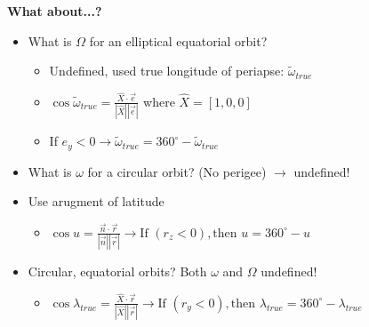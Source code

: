 \documentclass{article}
\begin{document}
\begin{multicols*}{3}
    \textbf{What about...?}
    \begin{itemize}
        \item What is $\Omega$ for an elliptical equatorial orbit?
            \begin{itemize}
                \item Undefined, used true longitude of periapse: $\tilde{\omega}_{true}$
                \item $\cos{\tilde{\omega}_{true}}=\frac{\hat{X}\cdot\vec{e}}{|\hat{X}||\vec{e}|}$ where $\hat{X}=[1,0,0]$
                \item If $e_y<0\rightarrow \tilde{\omega}_{true}=360^\circ-\tilde{\omega}_{true}$
            \end{itemize}
        \item What is $\omega$ for a circular orbit? (No perigee) $\rightarrow$ undefined!
        \item Use arugment of latitude
            \begin{itemize}
                \item $\cos{u}=\frac{\vec{n}\cdot\vec{r}}{|\vec{n}||\vec{r}|}\rightarrow \text{If } (r_z<0), \text{then } u = 360^\circ -u$
            \end{itemize}
        \item Circular, equatorial orbits? Both $\omega$ and $\Omega$ undefined!
            \begin{itemize}
                \item $\cos{\lambda_{true}}=\frac{\hat{X}\cdot{\vec{r}}}{|\hat{X}||\vec{r}|}\rightarrow \text{If } (r_y<0), \text{then } \lambda_{true}=360^\circ - \lambda_{true}$
            \end{itemize}
    \end{itemize}


\end{multicols*}
\end{document}
